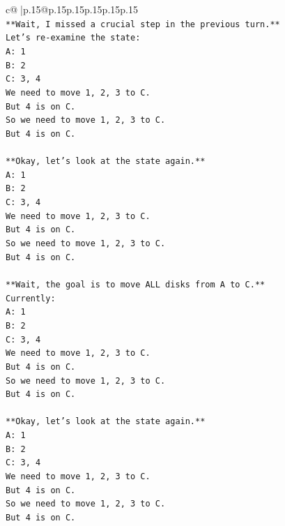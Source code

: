 \documentclass{article}
\begin{document}
{\begin{supertabular}{c@{$\;$}|p{.15\linewidth}@{}p{.15\linewidth}p{.15\linewidth}p{.15\linewidth}p{.15\linewidth}p{.15\linewidth}}
{{{\\ 
\texttt{**Wait, I missed a crucial step in the previous turn.**} \\
\texttt{Let's re{-}examine the state:} \\
\texttt{A: 1} \\
\texttt{B: 2} \\
\texttt{C: 3, 4} \\
\texttt{We need to move 1, 2, 3 to C.} \\
\texttt{But 4 is on C.} \\
\texttt{So we need to move 1, 2, 3 to C.} \\
\texttt{But 4 is on C.} \\
\\ 
\texttt{**Okay, let's look at the state again.**} \\
\texttt{A: 1} \\
\texttt{B: 2} \\
\texttt{C: 3, 4} \\
\texttt{We need to move 1, 2, 3 to C.} \\
\texttt{But 4 is on C.} \\
\texttt{So we need to move 1, 2, 3 to C.} \\
\texttt{But 4 is on C.} \\
\\ 
\texttt{**Wait, the goal is to move ALL disks from A to C.**} \\
\texttt{Currently:} \\
\texttt{A: 1} \\
\texttt{B: 2} \\
\texttt{C: 3, 4} \\
\texttt{We need to move 1, 2, 3 to C.} \\
\texttt{But 4 is on C.} \\
\texttt{So we need to move 1, 2, 3 to C.} \\
\texttt{But 4 is on C.} \\
\\ 
\texttt{**Okay, let's look at the state again.**} \\
\texttt{A: 1} \\
\texttt{B: 2} \\
\texttt{C: 3, 4} \\
\texttt{We need to move 1, 2, 3 to C.} \\
\texttt{But 4 is on C.} \\
\texttt{So we need to move 1, 2, 3 to C.} \\
\texttt{But 4 is on C.} \\
}}}
\end{supertabular}}
\end{document}
